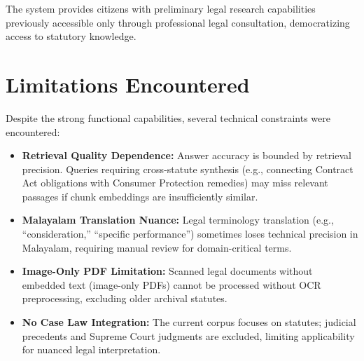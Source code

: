 \documentclass[12pt,a4paper]{report}
\begin{document}
The system provides citizens with preliminary legal research capabilities previously accessible only through professional legal consultation, democratizing access to statutory knowledge.

\section{Limitations Encountered}
Despite the strong functional capabilities, several technical constraints were encountered:
\begin{itemize}
    \item \textbf{Retrieval Quality Dependence:} Answer accuracy is bounded by retrieval precision. Queries requiring cross-statute synthesis (e.g., connecting Contract Act obligations with Consumer Protection remedies) may miss relevant passages if chunk embeddings are insufficiently similar.
    \item \textbf{Malayalam Translation Nuance:} Legal terminology translation (e.g., ``consideration,'' ``specific performance'') sometimes loses technical precision in Malayalam, requiring manual review for domain-critical terms.
    \item \textbf{Image-Only PDF Limitation:} Scanned legal documents without embedded text (image-only PDFs) cannot be processed without OCR preprocessing, excluding older archival statutes.
    \item \textbf{No Case Law Integration:} The current corpus focuses on statutes; judicial precedents and Supreme Court judgments are excluded, limiting applicability for nuanced legal interpretation.
\end{itemize}
\end{document}
